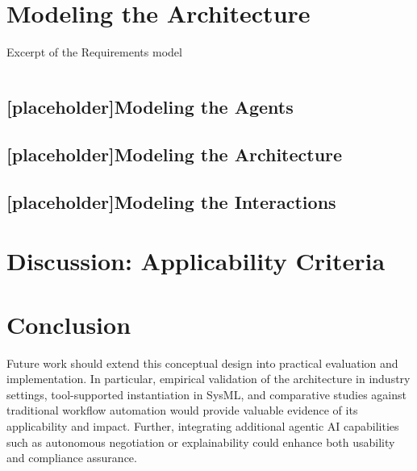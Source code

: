 \section{Modeling the Architecture}\label{sec:mod-mas}
\begin{listing}[h]
    \caption{Excerpt of the Requirements model}
    \inputminted[firstline=1,lastline=25]{text}{ressources/models/requirements.sysml}
\end{listing}
\subsection{[placeholder]Modeling the Agents}\label{subsec:mod-agents}
\subsection{[placeholder]Modeling the Architecture}\label{subsec:mod-arch}
\subsection{[placeholder]Modeling the Interactions}\label{subsec:mod-interactions}

\section{Discussion: Applicability Criteria}\label{sec:discussion}
    
\section{Conclusion}\label{sec:conclussion}
Future work should extend this conceptual design into practical evaluation and implementation. In particular, empirical validation of the architecture in industry settings, tool-supported instantiation in SysML, and comparative studies against traditional workflow automation would provide valuable evidence of its applicability and impact. Further, integrating additional agentic AI capabilities such as autonomous negotiation or explainability could enhance both usability and compliance assurance.
\clearpage